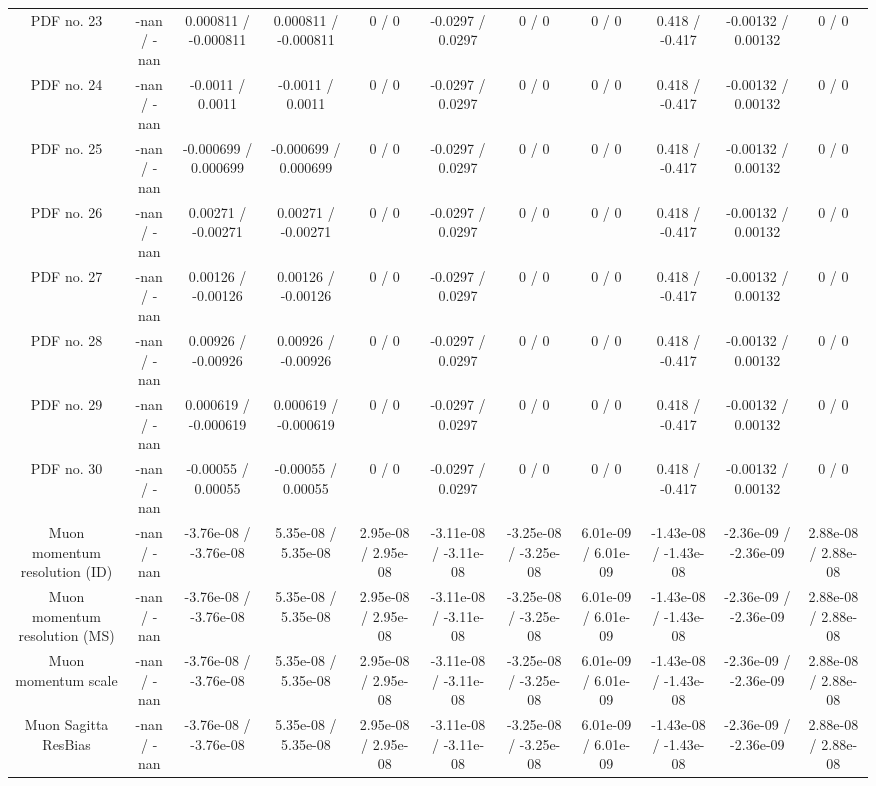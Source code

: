 \begin{table}[htbp]
\begin{center}
\begin{tabular}{|c|c|c|c|c|c|c|c|c|c|c|}
  PDF no. 23 & -nan / -nan & 0.000811 / -0.000811 & 0.000811 / -0.000811 & 0 / 0 & -0.0297 / 0.0297 & 0 / 0 & 0 / 0 & 0.418 / -0.417 & -0.00132 / 0.00132 & 0 / 0 \\ 
  PDF no. 24 & -nan / -nan & -0.0011 / 0.0011 & -0.0011 / 0.0011 & 0 / 0 & -0.0297 / 0.0297 & 0 / 0 & 0 / 0 & 0.418 / -0.417 & -0.00132 / 0.00132 & 0 / 0 \\ 
  PDF no. 25 & -nan / -nan & -0.000699 / 0.000699 & -0.000699 / 0.000699 & 0 / 0 & -0.0297 / 0.0297 & 0 / 0 & 0 / 0 & 0.418 / -0.417 & -0.00132 / 0.00132 & 0 / 0 \\ 
  PDF no. 26 & -nan / -nan & 0.00271 / -0.00271 & 0.00271 / -0.00271 & 0 / 0 & -0.0297 / 0.0297 & 0 / 0 & 0 / 0 & 0.418 / -0.417 & -0.00132 / 0.00132 & 0 / 0 \\ 
  PDF no. 27 & -nan / -nan & 0.00126 / -0.00126 & 0.00126 / -0.00126 & 0 / 0 & -0.0297 / 0.0297 & 0 / 0 & 0 / 0 & 0.418 / -0.417 & -0.00132 / 0.00132 & 0 / 0 \\ 
  PDF no. 28 & -nan / -nan & 0.00926 / -0.00926 & 0.00926 / -0.00926 & 0 / 0 & -0.0297 / 0.0297 & 0 / 0 & 0 / 0 & 0.418 / -0.417 & -0.00132 / 0.00132 & 0 / 0 \\ 
  PDF no. 29 & -nan / -nan & 0.000619 / -0.000619 & 0.000619 / -0.000619 & 0 / 0 & -0.0297 / 0.0297 & 0 / 0 & 0 / 0 & 0.418 / -0.417 & -0.00132 / 0.00132 & 0 / 0 \\ 
  PDF no. 30 & -nan / -nan & -0.00055 / 0.00055 & -0.00055 / 0.00055 & 0 / 0 & -0.0297 / 0.0297 & 0 / 0 & 0 / 0 & 0.418 / -0.417 & -0.00132 / 0.00132 & 0 / 0 \\ 
  Muon momentum resolution (ID) & -nan / -nan & -3.76e-08 / -3.76e-08 & 5.35e-08 / 5.35e-08 & 2.95e-08 / 2.95e-08 & -3.11e-08 / -3.11e-08 & -3.25e-08 / -3.25e-08 & 6.01e-09 / 6.01e-09 & -1.43e-08 / -1.43e-08 & -2.36e-09 / -2.36e-09 & 2.88e-08 / 2.88e-08 \\ 
  Muon momentum resolution (MS) & -nan / -nan & -3.76e-08 / -3.76e-08 & 5.35e-08 / 5.35e-08 & 2.95e-08 / 2.95e-08 & -3.11e-08 / -3.11e-08 & -3.25e-08 / -3.25e-08 & 6.01e-09 / 6.01e-09 & -1.43e-08 / -1.43e-08 & -2.36e-09 / -2.36e-09 & 2.88e-08 / 2.88e-08 \\ 
  Muon momentum scale & -nan / -nan & -3.76e-08 / -3.76e-08 & 5.35e-08 / 5.35e-08 & 2.95e-08 / 2.95e-08 & -3.11e-08 / -3.11e-08 & -3.25e-08 / -3.25e-08 & 6.01e-09 / 6.01e-09 & -1.43e-08 / -1.43e-08 & -2.36e-09 / -2.36e-09 & 2.88e-08 / 2.88e-08 \\ 
  Muon Sagitta ResBias & -nan / -nan & -3.76e-08 / -3.76e-08 & 5.35e-08 / 5.35e-08 & 2.95e-08 / 2.95e-08 & -3.11e-08 / -3.11e-08 & -3.25e-08 / -3.25e-08 & 6.01e-09 / 6.01e-09 & -1.43e-08 / -1.43e-08 & -2.36e-09 / -2.36e-09 & 2.88e-08 / 2.88e-08 \\ 

\end{tabular}
\end{center}
\end{table}
